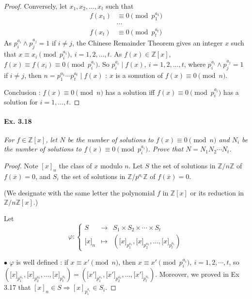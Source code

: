 \documentclass[11pt,a4paper]{article}
\newcommand{\Z}{\mathbb{Z}}
\begin{document}
{\begin{proof}
Conversely, let $x_1,x_2,\ldots,x_t$ such that
\begin{align*}
f(x_1)&\equiv 0 \pmod{p_1^{a_1}}\\
&\cdots\\
f(x_t)&\equiv 0 \pmod{p_t^{a_t}}
\end{align*}
As $p_i^{a_i} \wedge p_j^{a_j}=1$ if $i\ne j$, the Chinese Remainder Theorem gives an integer $x$ such that $x\equiv x_i \pmod {p_i^{a_i}},\ i=1,2,\ldots,t$. As $f(x)\in \Z[x]$, $f(x) \equiv f(x_i) \equiv 0 \pmod {p_i^{a_i}}$. So $p_i^{a_i} \mid f(x),\ i=1,2,\ldots,t$, where $p_i^{a_i} \wedge p_j^{a_j}=1$ if $i\ne j$, then $n = p_1^{a_1} \cdots p_t^{a_t} \mid f(x)$ : $x$ is a somution of $f(x) \equiv 0 \pmod n$.

Conclusion : $f(x) \equiv 0 \pmod n$ has a solution iff $f(x) \equiv 0 \pmod {p_i^{a_i}}$ has a solution for $i = 1, \ldots, t$.
\end{proof}

\paragraph{Ex. 3.18}

{\it For $f \in \Z[x]$, let $N$ be the number of solutions to $f(x) \equiv 0 \pmod n$ and $N_i$ be the number of solutions to $f(x) \equiv 0 \pmod {p_i^{a_i}}$. Prove that $N = N_1N_2\cdots N_t$.
}

\begin{proof}
Note $[x]_n$ the class of $x$ modulo $n$. Let $S$ the set of solutions in $\Z/n\Z$ of $f(\overline{x}) = 0$, and $S_i$ the set of solutions in $\Z/p^{a_i}\Z$ of $f(\overline{x}) = 0$.

(We designate with the same letter the polynomial $f$ in $\Z[x]$ or its reduction in $\Z/n\Z[x]$.)

Let
$$\varphi :
\left\{
\begin{array}{ccc}
  S&  \to  & S_1\times S_2\times \cdots\times S_t  \\
  {[}x{]}_n& \mapsto   & ({[}x{]}_{p_1^{a_1}}, {[}x{]}_{p_2^{a_2}},\ldots, {[}x{]}_{p_t^{a_t}})    
\end{array}
\right.
$$

$\bullet$ $\varphi$ is well defined : if $x \equiv x' \pmod n$, then $x \equiv x' \pmod {p_i^{a_i}},\ i=1,2,\cdots,t$, so $({[}x{]}_{p_1^{a_1}}, {[}x{]}_{p_2^{a_2}},\ldots, {[}x{]}_{p_t^{a_t}}) =({[}x'{]}_{p_1^{a_1}}, {[}x'{]}_{p_2^{a_2}},\ldots, {[}x'{]}_{p_t^{a_t}})$.  Moreover, we proved in Ex 3.17 that $[x]_n \in S \Rightarrow [x]_{p_i^{a_i}} \in S_i$.


\end{proof}}
\end{document}
